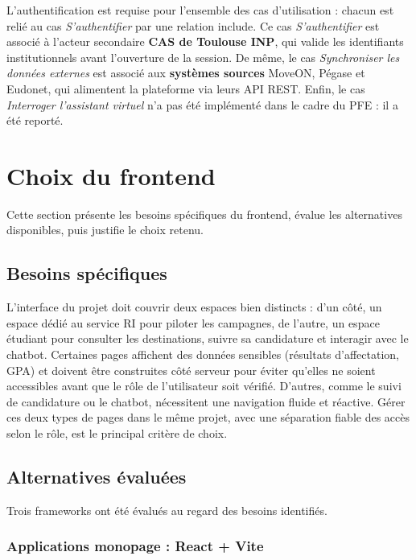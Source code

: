 L'authentification est requise pour l'ensemble des cas d'utilisation : chacun est relié au cas \textit{S'authentifier} par une relation \og include\fg{}. Ce cas \textit{S'authentifier} est associé à l'acteur secondaire \textbf{CAS de Toulouse INP}, qui valide les identifiants institutionnels avant l'ouverture de la session. De même, le cas \textit{Synchroniser les données externes} est associé aux \textbf{systèmes sources} MoveON, Pégase et Eudonet, qui alimentent la plateforme via leurs API REST. Enfin, le cas \textit{Interroger l'assistant virtuel} n'a pas été implémenté dans le cadre du PFE : il a été reporté.


\section{Choix du frontend}

Cette section présente les besoins spécifiques du frontend, évalue les
alternatives disponibles, puis justifie le choix retenu.

\subsection{Besoins spécifiques}

L'interface du projet doit couvrir deux espaces bien
distincts : d'un côté, un espace dédié au service RI
pour piloter les campagnes, de l'autre, un espace
étudiant pour consulter les destinations, suivre
sa candidature et interagir avec le chatbot.
Certaines pages affichent des données sensibles
(résultats d'affectation, GPA) et doivent être
construites côté serveur pour éviter qu'elles
ne soient accessibles avant que le rôle de
l'utilisateur soit vérifié. D'autres, comme
le suivi de candidature ou le chatbot,
nécessitent une navigation fluide et réactive.
Gérer ces deux types de pages dans le même projet,
avec une séparation fiable des accès selon le rôle,
est le principal critère de choix.

\subsection{Alternatives évaluées}

Trois frameworks ont été évalués au regard des besoins identifiés.

\subsubsection{Applications monopage : React + Vite}

